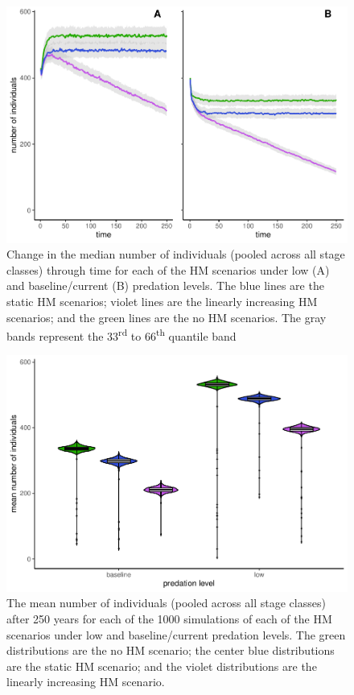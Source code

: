 \documentclass[11pt,]{article}
\begin{document}
\begin{figure}
\centering
\includegraphics{kea_PVA_manuscript_files/figure-latex/Population timeseries for HIM figure-1.pdf}
\caption{Change in the median number of individuals (pooled across all
stage classes) through time for each of the HM scenarios under low (A)
and baseline/current (B) predation levels. The blue lines are the static
HM scenarios; violet lines are the linearly increasing HM scenarios; and
the green lines are the no HM scenarios. The gray bands represent the
33\textsuperscript{rd} to 66\textsuperscript{th} quantile band}
\end{figure}

\begin{figure}
\centering
\includegraphics{kea_PVA_manuscript_files/figure-latex/Average population for HIM violin plot-1.pdf}
\caption{The mean number of individuals (pooled across all stage
classes) after 250 years for each of the 1000 simulations of each of the
HM scenarios under low and baseline/current predation levels. The green
distributions are the no HM scenario; the center blue distributions are
the static HM scenario; and the violet distributions are the linearly
increasing HM scenario.}
\end{figure}
\end{document}
